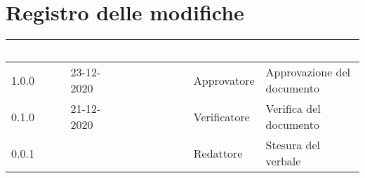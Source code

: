 \section*{Registro delle modifiche}
{
\setcounter{table}{-1}
{
\renewcommand{\arraystretch}{1.5}
\centering
\begin{longtable}{C{1.7cm} C{2.5cm} C{3.2cm} C{2.7cm} C{4.8cm}}
\textcolor{white}{\textbf{Versione}}&
\textcolor{white}{\textbf{Data}}&
\textcolor{white}{\textbf{Nominativo}}&
\textcolor{white}{\textbf{Ruolo}}&
\textcolor{white}{\textbf{Descrizione}}\\	
\endhead
		
1.0.0 & 23-12-2020 & \SG{} & Approvatore & Approvazione del documento\\
0.1.0 & 21-12-2020 & \RA{} & Verificatore & Verifica del documento\\		
0.0.1 & \Data{} & \SP{} & Redattore & Stesura del verbale\\
		
\end{longtable}
}
}